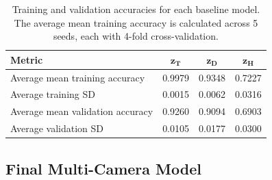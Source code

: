 \documentclass[remotesensing,article,submit,moreauthors]{Definitions/mdpi}
\begin{document}
\begin{table}[H]
\centering

\caption{Training and validation accuracies for each baseline model. The average mean training accuracy is calculated across 5 seeds, each with 4-fold cross-validation.}
\label{tab:train_val_accs}

\begin{tabular}{lccc}
\toprule
\textbf{Metric} & $\mathbf{z_T}$ & $\mathbf{z_D}$ & $\mathbf{z_H}$ \\
\midrule

Average mean training accuracy & 0.9979 & 0.9348 & 0.7227 \\
Average training SD & 0.0015 & 0.0062 & 0.0316 \\
Average mean validation accuracy & 0.9260 & 0.9094 & 0.6903 \\
Average validation SD & 0.0105 & 0.0177 & 0.0300 \\

\bottomrule
\end{tabular}

\end{table}

\subsection{Final Multi-Camera Model}
\end{document}
